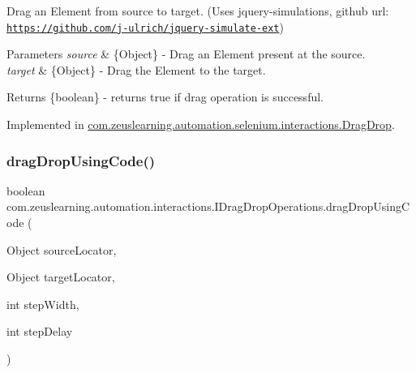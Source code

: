 Drag an Element from {\ttfamily source} to {\ttfamily target}. (Uses jquery-\/simulations, github url\+: \href{https://github.com/j-ulrich/jquery-simulate-ext}{\tt https\+://github.\+com/j-\/ulrich/jquery-\/simulate-\/ext})


\begin{DoxyParams}{Parameters}
{\em source} & \{Object\} -\/ Drag an Element present at the {\ttfamily source}. \\
\hline
{\em target} & \{Object\} -\/ Drag the Element to the {\ttfamily target}.\\
\hline
\end{DoxyParams}
\begin{DoxyReturn}{Returns}
\{boolean\} -\/ returns {\ttfamily true} if drag operation is successful. 
\end{DoxyReturn}


Implemented in \hyperlink{classcom_1_1zeuslearning_1_1automation_1_1selenium_1_1interactions_1_1DragDrop_acb4e035b12c5502ff045b5bede2e50d3}{com.\+zeuslearning.\+automation.\+selenium.\+interactions.\+Drag\+Drop}.

\hypertarget{interfacecom_1_1zeuslearning_1_1automation_1_1interactions_1_1IDragDropOperations_add2bbf31790e9254ef56f273cb73d707}{}\label{interfacecom_1_1zeuslearning_1_1automation_1_1interactions_1_1IDragDropOperations_add2bbf31790e9254ef56f273cb73d707} 
\subsubsection{\texorpdfstring{drag\+Drop\+Using\+Code()}{dragDropUsingCode()}\hspace{0.1cm}{\footnotesize\ttfamily [2/3]}}
{\footnotesize\ttfamily boolean com.\+zeuslearning.\+automation.\+interactions.\+I\+Drag\+Drop\+Operations.\+drag\+Drop\+Using\+Code (\begin{DoxyParamCaption}\item[{Object}]{source\+Locator,  }\item[{Object}]{target\+Locator,  }\item[{int}]{step\+Width,  }\item[{int}]{step\+Delay }\end{DoxyParamCaption})}

